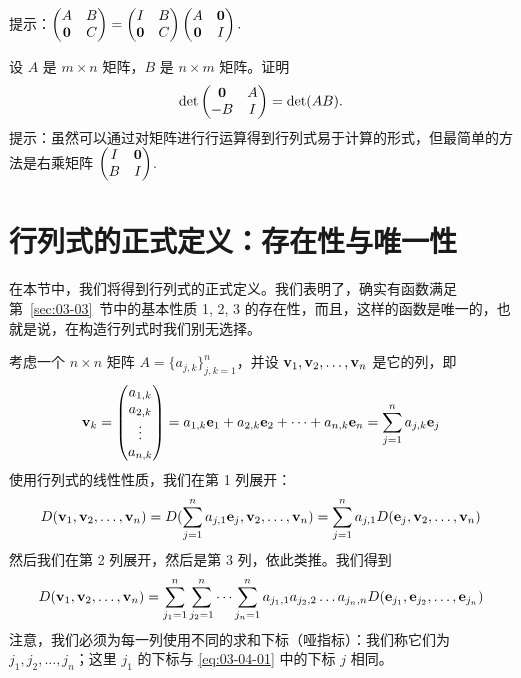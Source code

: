 \begin{problemset}
{\heiti 提示}：$\begin{pmatrix} A & B \\ \mathbf{0} & C \end{pmatrix} = \begin{pmatrix} I & B \\ \mathbf{0} & C \end{pmatrix} \begin{pmatrix} A & \mathbf{0} \\ \mathbf{0} & I \end{pmatrix}.$
\item \label{ex:03-03-12} 设 $A$ 是 $m \times n$ 矩阵，$B$ 是 $n \times m$ 矩阵。证明
$$\det \begin{pmatrix} \mathbf{0} & A \\ -B & I \end{pmatrix} = \det(AB).$$
{\heiti 提示}：虽然可以通过对矩阵进行行运算得到行列式易于计算的形式，但最简单的方法是右乘矩阵 $\begin{pmatrix} I & \mathbf{0} \\ B & I \end{pmatrix}$.
\end{problemset}

\section{行列式的正式定义：存在性与唯一性}\label{sec:03-04}

在本节中，我们将得到行列式的正式定义。我们表明了，确实有函数满足第~\ref{sec:03-03}~节中的基本性质 1, 2, 3 的存在性，而且，这样的函数是唯一的，也就是说，在构造行列式时我们别无选择。

考虑一个 $n \times n$ 矩阵 $A = \{a_{j,k}\}^{n}_{j,k=1}$，并设 $\mathbf{v}_1, \mathbf{v}_2, \dots, \mathbf{v}_n$ 是它的列，即
$$
\mathbf{v}_k = \begin{pmatrix} a_{1,k} \\ a_{2,k} \\ \vdots \\ a_{n,k} \end{pmatrix} = a_{1,k} \mathbf{e}_1 + a_{2,k} \mathbf{e}_2 + \dots + a_{n,k} \mathbf{e}_n = \sum_{j=1}^n a_{j,k} \mathbf{e}_j
$$
使用行列式的线性性质，我们在第 1 列展开：
\begin{equation}\label{eq:03-04-01}
D(\mathbf{v}_1, \mathbf{v}_2, \dots, \mathbf{v}_n) = D(\sum_{j=1}^n a_{j,1} \mathbf{e}_j, \mathbf{v}_2, \dots, \mathbf{v}_n) = \sum_{j=1}^n a_{j,1} D(\mathbf{e}_j, \mathbf{v}_2, \dots, \mathbf{v}_n)
\end{equation}
然后我们在第 2 列展开，然后是第 3 列，依此类推。我们得到
$$
D(\mathbf{v}_1, \mathbf{v}_2, \dots, \mathbf{v}_n) = \sum_{j_1=1}^n \sum_{j_2=1}^n \dots \sum_{j_n=1}^n a_{j_1,1} a_{j_2,2} \dots a_{j_n,n} D(\mathbf{e}_{j_1}, \mathbf{e}_{j_2}, \dots, \mathbf{e}_{j_n})
$$
注意，我们必须为每一列使用不同的求和下标（哑指标）：我们称它们为 $j_1, j_2, \dots, j_n$；这里 $j_1$ 的下标与 \eqref{eq:03-04-01} 中的下标 $j$ 相同。

